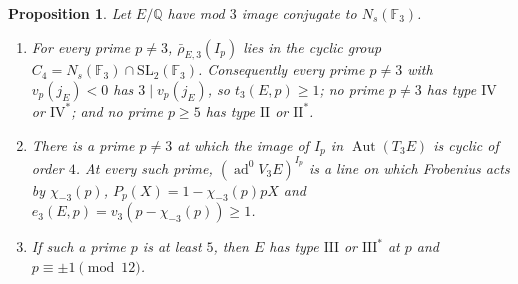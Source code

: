 \documentclass[11pt]{amsart}
\newtheorem{proposition}[theorem]{Proposition}
\theoremstyle{definition}
\newcommand{\Q}{\mathbb{Q}}
\newcommand{\F}{\mathbb{F}}
\newcommand{\ad}{\operatorname{ad}^0}
\newcommand{\SL}{\mathrm{SL}}
\begin{document}
\begin{proposition}\label{prop:ns-structure}
Let $E/\Q$ have mod $3$ image conjugate to $N_s(\F_3)$.
\begin{enumerate}
\item[(i)] For every prime $p\ne3$, $\bar\rho_{E,3}(I_p)$ lies in the cyclic group $C_4=N_s(\F_3)\cap\SL_2(\F_3)$. Consequently every prime $p\ne3$ with $v_p(j_E)<0$ has $3\mid v_p(j_E)$, so $t_3(E,p)\ge1$; no prime $p\ne3$ has type $\mathrm{IV}$ or $\mathrm{IV}^*$; and no prime $p\ge5$ has type $\mathrm{II}$ or $\mathrm{II}^*$.
\item[(ii)] There is a prime $p\ne3$ at which the image of $I_p$ in $\operatorname{Aut}(T_3E)$ is cyclic of order $4$. At every such prime, $(\ad V_3E)^{I_p}$ is a line on which Frobenius acts by $\chi_{-3}(p)$, $P_p(X)=1-\chi_{-3}(p)pX$ and $e_3(E,p)=v_3(p-\chi_{-3}(p))\ge1$.
\item[(iii)] If such a prime $p$ is at least $5$, then $E$ has type $\mathrm{III}$ or $\mathrm{III}^*$ at $p$ and $p\equiv\pm1\pmod{12}$.
\end{enumerate}
\end{proposition}
\end{document}
